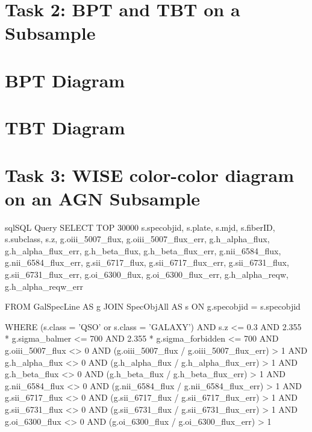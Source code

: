 \documentclass[letterpaper, oneside]{article}
\begin{document}

\section*{Task 2: BPT and TBT on a Subsample}

\section{BPT Diagram}



\section{TBT Diagram}




\section*{Task 3: WISE color-color diagram on an AGN Subsample}





\pagebreak
\appendix

\begin{sourcecode}[\label{sdss_query}]{sql}{SQL Query}
SELECT TOP 30000 s.specobjid, s.plate, s.mjd, s.fiberID, 
s.subclass, s.z, 
g.oiii_5007_flux, g.oiii_5007_flux_err, 
g.h_alpha_flux, g.h_alpha_flux_err, 
g.h_beta_flux, g.h_beta_flux_err, 
g.nii_6584_flux, g.nii_6584_flux_err, 
g.sii_6717_flux, g.sii_6717_flux_err, 
g.sii_6731_flux, g.sii_6731_flux_err, 
g.oi_6300_flux, g.oi_6300_flux_err, 
g.h_alpha_reqw, g.h_alpha_reqw_err

FROM GalSpecLine AS g 
JOIN SpecObjAll AS s ON g.specobjid = s.specobjid

WHERE
(s.class = 'QSO' or s.class = 'GALAXY')
AND s.z <= 0.3
AND 2.355 * g.sigma_balmer <= 700
AND 2.355 * g.sigma_forbidden <= 700
AND g.oiii_5007_flux <> 0
AND (g.oiii_5007_flux / g.oiii_5007_flux_err) > 1
AND g.h_alpha_flux <> 0
AND (g.h_alpha_flux / g.h_alpha_flux_err) > 1
AND g.h_beta_flux <> 0
AND (g.h_beta_flux / g.h_beta_flux_err) > 1
AND g.nii_6584_flux <> 0
AND (g.nii_6584_flux / g.nii_6584_flux_err) > 1
AND g.sii_6717_flux <> 0
AND (g.sii_6717_flux / g.sii_6717_flux_err) > 1
AND g.sii_6731_flux <> 0
AND (g.sii_6731_flux / g.sii_6731_flux_err) > 1
AND g.oi_6300_flux <> 0
AND (g.oi_6300_flux / g.oi_6300_flux_err) > 1
\end{sourcecode}
\end{document}

